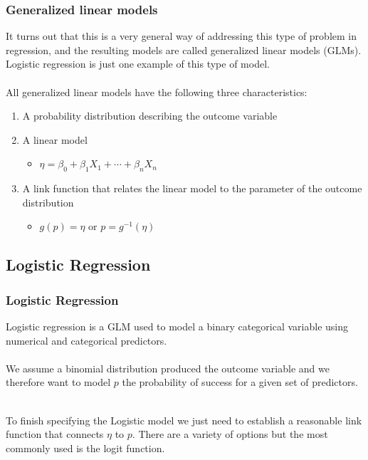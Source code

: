 
\begin{frame}
\frametitle{Generalized linear models}

It turns out that this is a very general way of addressing this type of problem in regression, and the resulting models are called generalized linear models (GLMs). Logistic regression is just one example of this type of model.\\
~\\
\pause
All generalized linear models have the following three characteristics:
\begin{enumerate}
\item A probability distribution describing the outcome variable 
\item A linear model
\begin{itemize}
\item $\eta = \beta_0+\beta_1 X_1 + \cdots + \beta_n X_n$
\end{itemize}
\item A link function that relates the linear model to the parameter of the outcome distribution
\begin{itemize}
\item $g(p) = \eta$ or $p = g^{-1}(\eta)$
\end{itemize}
\end{enumerate}

\end{frame}


\subsection{Logistic Regression}


\begin{frame}
\frametitle{Logistic Regression}

Logistic regression is a GLM used to model a binary categorical variable using numerical and categorical predictors.\\
~\\
We assume a binomial distribution produced the outcome variable and we therefore want to model $p$ the probability of success for a given set of predictors.\\
~\\

\pause

To finish specifying the Logistic model we just need to establish a reasonable link function that connects $\eta$ to $p$. There are a variety of options but the most commonly used is the logit function.\\

~\\


\end{frame}


